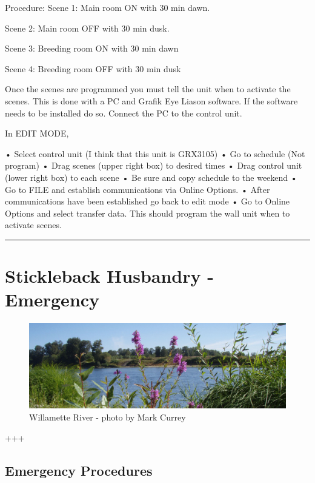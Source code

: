 \documentclass[
]{book}
\begin{document}
Procedure:
Scene 1: Main room ON with 30 min dawn.

Scene 2: Main room OFF with 30 min dusk.

Scene 3: Breeding room ON with 30 min dawn

Scene 4: Breeding room OFF with 30 min dusk

Once the scenes are programmed you must tell the unit when to activate the scenes. This is done with a PC and Grafik Eye Liason software. If the software needs to be installed do so. Connect the PC to the control unit.

In EDIT MODE,

• Select control unit (I think that this unit is GRX3105)
• Go to schedule (Not program)
• Drag scenes (upper right box) to desired times
• Drag control unit (lower right box) to each scene
• Be sure and copy schedule to the weekend
• Go to FILE and establish communications via Online Options.
• After communications have been established go back to edit mode
• Go to Online Options and select transfer data. This should program the wall unit when to activate scenes.

\begin{center}\rule{0.5\linewidth}{0.5pt}\end{center}

\hypertarget{stickleback-husbandry---emergency}{%
\chapter{Stickleback Husbandry - Emergency}\label{stickleback-husbandry---emergency}}

\begin{figure}
\centering
\includegraphics{images/willamette_header.jpg}
\caption{Willamette River - photo by Mark Currey}
\end{figure}

+++

\hypertarget{emergency-procedures}{%
\section{Emergency Procedures}\label{emergency-procedures}}
\end{document}
